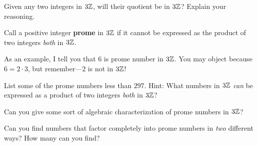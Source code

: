 \documentclass[nooutcomes]{ximera}
\begin{document}
\begin{problem}
Given any two integers in $3\mathbb Z$, will their quotient be in $3\mathbb Z$?
Explain your reasoning.
\end{problem}

\begin{definition}
Call a positive integer \textbf{prome} in $3\mathbb Z$ if it cannot be
expressed as the product of two integers \textit{both} in $3\mathbb Z$.
\end{definition}

As an example, I tell you that $6$ is prome number in $3\mathbb Z$. You may
object because $6 = 2\cdot 3$, but remember---$2$ is not in $3\mathbb Z$!


\begin{problem}
List some of the prome numbers less than $297$.  Hint:  What numbers in $3\mathbb Z$ \emph{can} be expressed as a product of two integers \emph{both} in $3\mathbb Z$?  
\end{problem}

\begin{problem}
Can you give some sort of algebraic characterization of prome numbers
in $3\mathbb Z$? 
\end{problem}

\begin{problem}
Can you find numbers that factor completely into prome numbers in
\textit{two} different ways? How many can you find?
\end{problem}
\end{document}
